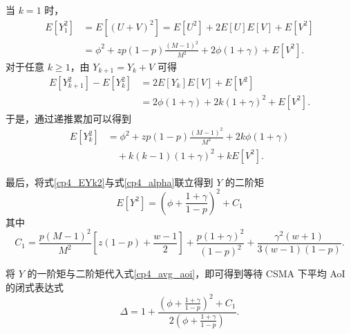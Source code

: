 \begin{enumerate}[wide]
    当 $k=1$ 时，
    \begin{equation}\label{cp4_EY1^2}
        \begin{split}
E\left[Y_1^2\right] &= E\left[(U + V)^2\right] = E\left[U^2\right] + 2E\left[U\right]E\left[V\right] + E\left[V^2\right] \\
&= \phi^2 + zp(1 - p) \frac{(M - 1)^2}{M^2} + 2\phi(1 + \gamma) + E\left[V^2\right].
        \end{split}
    \end{equation}
对于任意 $k \ge 1$，由 $Y_{k+1}=Y_k + V$ 可得
    \begin{equation}\label{cp4_EYK+1^2-EYk^2}
        \begin{split}
E\left[Y_{k+1}^2\right] - E\left[Y_k^2\right] &= 2E\left[Y_k\right]E\left[V\right] + E\left[V^2\right] \\
&= 2\phi(1 + \gamma) + 2k(1 + \gamma)^2 + E\left[V^2\right].
        \end{split}
    \end{equation}
于是，通过递推累加可以得到
    \begin{equation}\label{cp4_EYk2}
        \begin{split}
E\left[Y_k^2\right] &= \phi^2 + zp(1 - p) \frac{(M - 1)^2}{M^2} + 2k\phi(1 + \gamma) \\
&\quad + k(k - 1)(1 + \gamma)^2 + kE\left[V^2\right].
        \end{split}
    \end{equation}

    最后，将式\eqref{cp4_EYk2}与式\eqref{cp4_alpha}联立得到 $Y$ 的二阶矩
    \begin{equation}\label{cp4_EY2result}
        E\left[Y^2\right] = \left( \phi + \frac{1+\gamma}{1-p} \right)^2 + C_1
    \end{equation}
    其中
    \begin{equation}\label{cp4_C1}
        C_1 = \frac{p(M-1)^2}{M^2} \left[ z(1-p) + \frac{w-1}{2} \right]
        + \frac{p(1+\gamma)^2}{(1-p)^2}
        + \frac{\gamma^2 (w+1)}{3(w-1)(1-p)}.
    \end{equation}
\end{enumerate}

将 $Y$ 的一阶矩与二阶矩代入式\eqref{cp4_avg_aoi}，即可得到等待 CSMA 下平均 AoI 的闭式表达式
\begin{equation}\label{cp4_AoI_Final}
    \Delta = 1 + \frac{\left( \phi + \frac{1+\gamma}{1-p} \right)^2 + C_1}{2\left( \phi + \frac{1+\gamma}{1-p} \right)}.
\end{equation}

